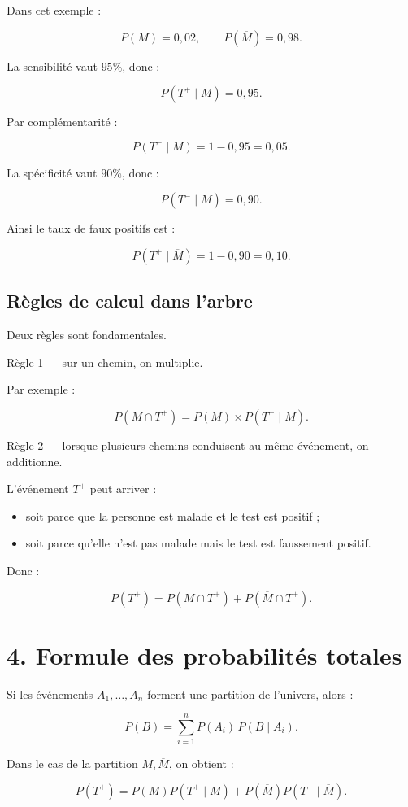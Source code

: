 Dans cet exemple :

\[
P(M)=0{,}02,
\qquad
P(\overline M)=0{,}98.
\]

La sensibilité vaut $95\%$, donc :

\[
P(T^+\mid M)=0{,}95.
\]

Par complémentarité :

\[
P(T^-\mid M)=1-0{,}95=0{,}05.
\]

La spécificité vaut $90\%$, donc :

\[
P(T^-\mid \overline M)=0{,}90.
\]

Ainsi le taux de faux positifs est :

\[
P(T^+\mid\overline M)=1-0{,}90=0{,}10.
\]

\subsection{Règles de calcul dans l'arbre}

Deux règles sont fondamentales.

Règle 1 — sur un chemin, on multiplie.

Par exemple :

\[
P(M\cap T^+)=P(M)\times P(T^+\mid M).
\]

Règle 2 — lorsque plusieurs chemins conduisent au même événement, on additionne.

L'événement $T^+$ peut arriver :

\begin{itemize}
\item soit parce que la personne est malade et le test est positif ;
\item soit parce qu'elle n'est pas malade mais le test est faussement positif.
\end{itemize}

Donc :

\[
P(T^+)=P(M\cap T^+)+P(\overline M\cap T^+).
\]


\section{4. Formule des probabilités totales}

Si les événements $A_1,\ldots,A_n$ forment une partition de l'univers, alors :

\[
P(B)=\sum_{i=1}^{n} P(A_i)\,P(B\mid A_i).
\]

Dans le cas de la partition $M,\overline M$, on obtient :

\[
P(T^+)
=
P(M)P(T^+\mid M)
+
P(\overline M)P(T^+\mid\overline M).
\]

